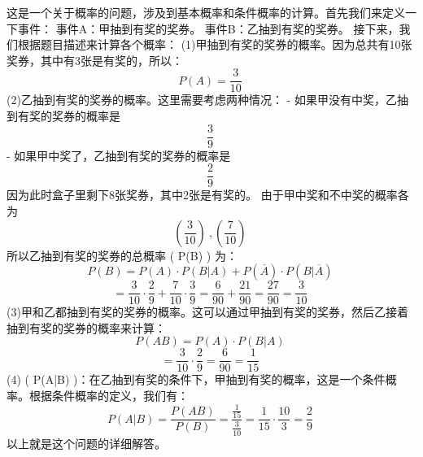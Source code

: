
这是一个关于概率的问题，涉及到基本概率和条件概率的计算。首先我们来定义一下事件：  事件A：甲抽到有奖的奖券。 事件B：乙抽到有奖的奖券。 接下来，我们根据题目描述来计算各个概率： (1)甲抽到有奖的奖券的概率。因为总共有10张奖券，其中有3张是有奖的，所以： \begin{equation}
 P(A) = \frac{3}{10}  ~
\end{equation}(2)乙抽到有奖的奖券的概率。这里需要考虑两种情况： - 如果甲没有中奖，乙抽到有奖的奖券的概率是
\begin{equation}
 \frac{3}{9}~
\end{equation}
 - 如果甲中奖了，乙抽到有奖的奖券的概率是 \begin{equation}
 \frac{2}{9}~
 \end{equation}因为此时盒子里剩下8张奖券，其中2张是有奖的。 由于甲中奖和不中奖的概率各为 \begin{equation}
 ( \frac{3}{10} )~,(\frac{7}{10})~
 \end{equation}所以乙抽到有奖的奖券的总概率 ( P(B) ) 为： \begin{equation}
  P(B) = P(A) \cdot P(B|A) + P(\overline{A}) \cdot P(B|\overline{A})~
 \end{equation}\begin{equation}
 = \frac{3}{10} \cdot \frac{2}{9} + \frac{7}{10} \cdot \frac{3}{9} = \frac{6}{90} + \frac{21}{90} = \frac{27}{90} = \frac{3}{10} ~
 \end{equation}(3)甲和乙都抽到有奖的奖券的概率。这可以通过甲抽到有奖的奖券，然后乙接着抽到有奖的奖券的概率来计算： \begin{equation}
  P(AB) = P(A) \cdot P(B|A) ~
 \end{equation}
 \begin{equation}
 = \frac{3}{10} \cdot \frac{2}{9} = \frac{6}{90} = \frac{1}{15} ~
 \end{equation}
 (4) ( P(A|B) )：在乙抽到有奖的条件下，甲抽到有奖的概率，这是一个条件概率。根据条件概率的定义，我们有： \begin{equation}
  P(A|B) = \frac{P(AB)}{P(B)}  = \frac{\frac{1}{15}}{\frac{3}{10}}= \frac{1}{15} \cdot \frac{10}{3} = \frac{2}{9}  ~
 \end{equation}
 以上就是这个问题的详细解答。

